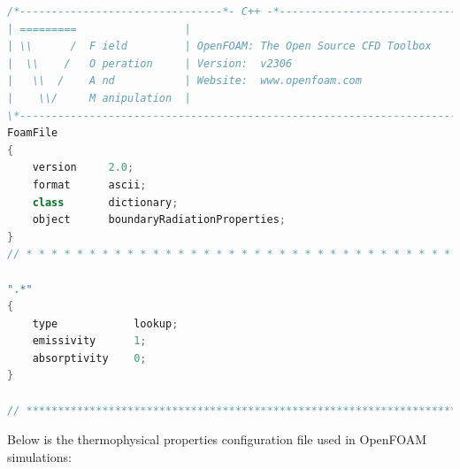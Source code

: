 \begin{lstlisting}[language=C++, caption={boundaryRadiationProperties}]
/*--------------------------------*- C++ -*----------------------------------*\
| =========                 |                                                 |
| \\      /  F ield         | OpenFOAM: The Open Source CFD Toolbox           |
|  \\    /   O peration     | Version:  v2306                                 |
|   \\  /    A nd           | Website:  www.openfoam.com                      |
|    \\/     M anipulation  |                                                 |
\*---------------------------------------------------------------------------*/
FoamFile
{
    version     2.0;
    format      ascii;
    class       dictionary;
    object      boundaryRadiationProperties;
}
// * * * * * * * * * * * * * * * * * * * * * * * * * * * * * * * * * * * * * //

".*"
{
    type            lookup;
    emissivity      1;
    absorptivity    0;
}

// ************************************************************************* //
\end{lstlisting}                                                                  


Below is the thermophysical properties configuration file used in OpenFOAM simulations:

